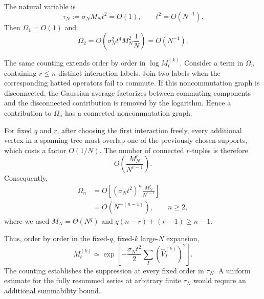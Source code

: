 \documentclass{article}
\theoremstyle{definition}
\begin{document}
The natural variable is
\begin{equation}
    \tau_N:=\sigma_NM_Nt^2=O(1),
    \qquad
    t^2=O(N^{-1}).
\end{equation}
Then $\Omega_1=O(1)$ and
\begin{equation}
    \Omega_2
    =O\!\left(
       \sigma_N^2t^4M_N^2\frac1N
    \right)
    =O(N^{-1}).
\end{equation}

The same counting extends order by order in $\log M_t^{(k)}$.  Consider a
term in $\Omega_n$ containing $r\le n$ distinct interaction labels.  Join
two labels when the corresponding hatted operators fail to commute.  If
this noncommutation graph is disconnected, the Gaussian average factorizes
between commuting components and the disconnected contribution is removed
by the logarithm.  Hence a contribution to $\Omega_n$ has a connected
noncommutation graph.

For fixed $q$ and $r$, after choosing the first interaction freely, every
additional vertex in a spanning tree must overlap one of the previously
chosen supports, which costs a factor $O(1/N)$.  The number of connected
$r$-tuples is therefore
\begin{equation}
    O\!\left(\frac{M_N^r}{N^{r-1}}\right).
\end{equation}
Consequently,
\begin{align}
    \Omega_n
    &=O\!\left[
       (\sigma_Nt^2)^n
       \frac{M_N^r}{N^{r-1}}
    \right]
    \nonumber\\
    &=O(N^{-(n-1)}),
    \qquad n\ge2,
\end{align}
where we used $M_N=\Theta(N^q)$ and
$q(n-r)+(r-1)\ge n-1$.

Thus, order by order in the fixed-$q$, fixed-$k$ large-$N$ expansion,
\begin{equation}
    M_t^{(k)}
    \simeq
    \exp\!\left[
       -\frac{\sigma_Nt^2}{2}
       \sum_I(\widehat V_I^{(k)})^2
    \right].
\end{equation}
The counting establishes the suppression at every fixed order in $\tau_N$.
A uniform estimate for the fully resummed series at arbitrary finite
$\tau_N$ would require an additional summability bound.
\end{document}
